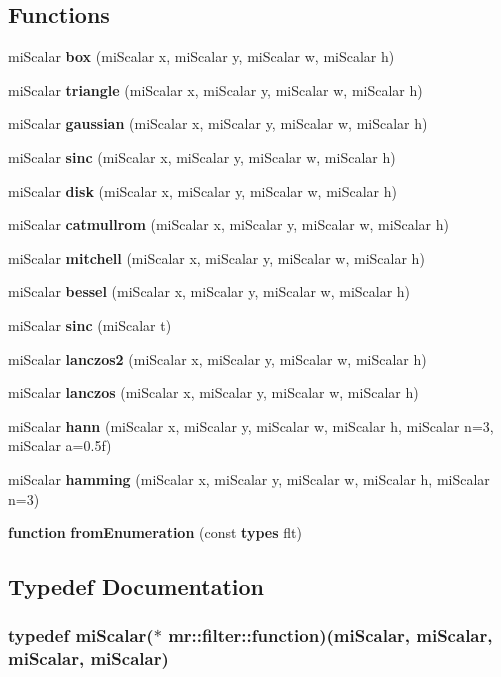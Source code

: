 \subsection*{Functions}
\begin{CompactItemize}
\item 
mi\-Scalar {\bf box} (mi\-Scalar x, mi\-Scalar y, mi\-Scalar w, mi\-Scalar h)
\item 
mi\-Scalar {\bf triangle} (mi\-Scalar x, mi\-Scalar y, mi\-Scalar w, mi\-Scalar h)
\item 
mi\-Scalar {\bf gaussian} (mi\-Scalar x, mi\-Scalar y, mi\-Scalar w, mi\-Scalar h)
\item 
mi\-Scalar {\bf sinc} (mi\-Scalar x, mi\-Scalar y, mi\-Scalar w, mi\-Scalar h)
\item 
mi\-Scalar {\bf disk} (mi\-Scalar x, mi\-Scalar y, mi\-Scalar w, mi\-Scalar h)
\item 
mi\-Scalar {\bf catmullrom} (mi\-Scalar x, mi\-Scalar y, mi\-Scalar w, mi\-Scalar h)
\item 
mi\-Scalar {\bf mitchell} (mi\-Scalar x, mi\-Scalar y, mi\-Scalar w, mi\-Scalar h)
\item 
mi\-Scalar {\bf bessel} (mi\-Scalar x, mi\-Scalar y, mi\-Scalar w, mi\-Scalar h)
\item 
mi\-Scalar {\bf sinc} (mi\-Scalar t)
\item 
mi\-Scalar {\bf lanczos2} (mi\-Scalar x, mi\-Scalar y, mi\-Scalar w, mi\-Scalar h)
\item 
mi\-Scalar {\bf lanczos} (mi\-Scalar x, mi\-Scalar y, mi\-Scalar w, mi\-Scalar h)
\item 
mi\-Scalar {\bf hann} (mi\-Scalar x, mi\-Scalar y, mi\-Scalar w, mi\-Scalar h, mi\-Scalar n=3, mi\-Scalar a=0.5f)
\item 
mi\-Scalar {\bf hamming} (mi\-Scalar x, mi\-Scalar y, mi\-Scalar w, mi\-Scalar h, mi\-Scalar n=3)
\item 
{\bf function} {\bf from\-Enumeration} (const {\bf types} flt)
\end{CompactItemize}


\subsection{Typedef Documentation}
\subsubsection{\setlength{\rightskip}{0pt plus 5cm}typedef mi\-Scalar($\ast$ {\bf mr::filter::function})(mi\-Scalar, mi\-Scalar, mi\-Scalar, mi\-Scalar)}\label{namespacemr_1_1filter_a0}


